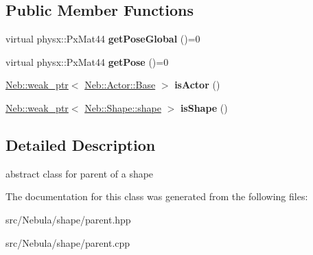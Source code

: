\subsection*{\-Public \-Member \-Functions}
\begin{DoxyCompactItemize}
\item 
\hypertarget{classNeb_1_1Shape_1_1parent_a983131de9b12b32f30dd418b0779b509}{virtual physx\-::\-Px\-Mat44 {\bfseries get\-Pose\-Global} ()=0}\label{classNeb_1_1Shape_1_1parent_a983131de9b12b32f30dd418b0779b509}

\item 
\hypertarget{classNeb_1_1Shape_1_1parent_a38a4a71ad092ebd7c5b4e76ab20d2a1c}{virtual physx\-::\-Px\-Mat44 {\bfseries get\-Pose} ()=0}\label{classNeb_1_1Shape_1_1parent_a38a4a71ad092ebd7c5b4e76ab20d2a1c}

\item 
\hypertarget{classNeb_1_1Shape_1_1parent_ad8b140d7fd824fbc3248e711f9b748bc}{\hyperlink{classNeb_1_1weak__ptr}{\-Neb\-::weak\-\_\-ptr}$<$ \hyperlink{classNeb_1_1Actor_1_1Base}{\-Neb\-::\-Actor\-::\-Base} $>$ {\bfseries is\-Actor} ()}\label{classNeb_1_1Shape_1_1parent_ad8b140d7fd824fbc3248e711f9b748bc}

\item 
\hypertarget{classNeb_1_1Shape_1_1parent_ab41114661259f3f7dac9b251ea542e56}{\hyperlink{classNeb_1_1weak__ptr}{\-Neb\-::weak\-\_\-ptr}$<$ \hyperlink{classNeb_1_1Shape_1_1shape}{\-Neb\-::\-Shape\-::shape} $>$ {\bfseries is\-Shape} ()}\label{classNeb_1_1Shape_1_1parent_ab41114661259f3f7dac9b251ea542e56}

\end{DoxyCompactItemize}


\subsection{\-Detailed \-Description}
abstract class for parent of a shape 

\-The documentation for this class was generated from the following files\-:\begin{DoxyCompactItemize}
\item 
src/\-Nebula/shape/parent.\-hpp\item 
src/\-Nebula/shape/parent.\-cpp\end{DoxyCompactItemize}
